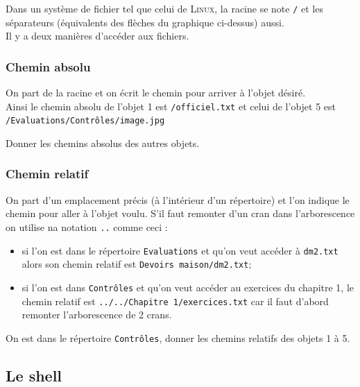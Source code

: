 	Dans un système de fichier tel que celui de \textsc{Linux}, la racine se note \texttt{/} et les séparateurs (équivalents des flèches du graphique ci-dessus) aussi.\\
	Il y a deux manières d'accéder aux fichiers.

	\subsubsection{Chemin absolu}
	On part de la racine et on écrit le chemin pour arriver à l'objet désiré.\\
	Ainsi le chemin absolu de l'objet 1 est \texttt{/officiel.txt} et celui de l'objet 5 est \texttt{/Evaluations/Contrôles/image.jpg}
	
	\begin{exercice}[]
		Donner les chemins absolus des autres objets.
	\end{exercice}

	

	\subsubsection{Chemin relatif}
	On part d'un emplacement précis (à l'intérieur d'un répertoire) et l'on indique le chemin pour aller à l'objet voulu. S'il faut remonter d'un cran dans l'arborescence on utilise na notation \texttt{..} comme ceci :
	\begin{itemize}
		\item 	si l'on est dans le répertoire \texttt{Evaluations} et qu'on veut accéder à \texttt{dm2.txt} alors son chemin relatif est \texttt{Devoirs maison/dm2.txt};
		\item 	si l'on est dans \texttt{Contrôles} et qu'on veut accéder au exercices du chapitre 1, le chemin relatif est \texttt{../../Chapitre 1/exercices.txt} car il faut d'abord remonter l'arborescence de 2 crans.
	\end{itemize}

	\begin{exercice}[]
		On est dans le répertoire \texttt{Contrôles}, donner les chemins relatifs des objets 1 à 5.
	\end{exercice}
	
	\subsection{Le shell}
	

